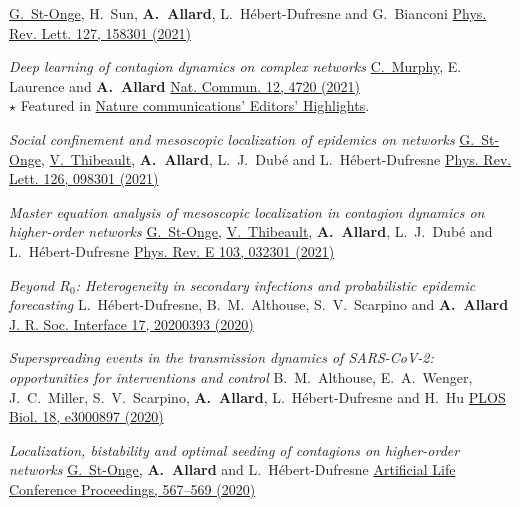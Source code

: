 \documentclass[11pt]{article}
\makeatletter
\newcommand{\reversearabic}[1]{\expandafter\@reversearabic\csname c@#1\endcsname}
\newcommand{\@reversearabic}[1]{%
  \number\numexpr\getrefnumber{this@etaremune@\romannumeral\c@etaremune}-#1+1\relax
}
\newcounter{etaremune}
\newenvironment{etaremune}[1][]{%
  \stepcounter{etaremune}%
  \begin{enumerate}[label=\reversearabic*.,#1]%
}{%
  \edef\@currentlabel{\the\csname c@\@enumctr\endcsname}%
  \label{this@etaremune@\romannumeral\c@etaremune}%
  \end{enumerate}%
}
\makeatother
\begin{document}
\begin{etaremune}[itemsep=0.5em, label={[A\reversearabic*]}]
{  \uline{G.~St-Onge}, H.~Sun, \textbf{A.~Allard}, L.~H\'ebert-Dufresne and G.~Bianconi\split
  \href{https://doi.org/10.1103/PhysRevLett.127.158301}{Phys. Rev. Lett. 127, 158301 (2021)}}
%
  \item \parbox[t]{\textwidth-30pt}{\textit{Deep learning of contagion dynamics on complex networks}\split
  \uline{C.~Murphy}, E. Laurence and \textbf{A.~Allard}\split
  \href{https://doi.org/10.1038/s41467-021-24732-2}{Nat. Commun. 12, 4720 (2021)}\\
  {\footnotesize $\star$ Featured in \href{https://www.nature.com/ncomms/editorshighlights}{Nature communications' Editors' Highlights}.}}
%
  \item \parbox[t]{\textwidth-30pt}{\textit{Social confinement and mesoscopic localization of epidemics on networks}\split
  \uline{G.~St-Onge}, \uline{V.~Thibeault}, \textbf{A.~Allard}, L.~J.~Dub\'e and L.~H\'ebert-Dufresne\split
  \href{http://doi.org/10.1103/PhysRevLett.126.098301}{Phys. Rev. Lett. 126, 098301 (2021)}}
%
  \item \parbox[t]{\textwidth-30pt}{\textit{Master equation analysis of mesoscopic localization in contagion dynamics on higher-order networks}\split
  \uline{G.~St-Onge}, \uline{V.~Thibeault}, \textbf{A.~Allard}, L.~J.~Dub\'e and L.~H\'ebert-Dufresne\split
  \href{http://doi.org/10.1103/PhysRevE.103.032301}{Phys. Rev. E 103, 032301 (2021)}}
  \item \parbox[t]{\textwidth-30pt}{\textit{Beyond $R_0$: Heterogeneity in secondary infections and probabilistic epidemic forecasting}\split
  L.~H\'ebert-Dufresne, B.~M.~Althouse, S.~V.~Scarpino and \textbf{A.~Allard}\split
  \href{https://doi.org/10.1098/rsif.2020.0393}{J. R. Soc. Interface 17, 20200393 (2020)}}
%
  \item \parbox[t]{\textwidth-30pt}{\textit{Superspreading events in the transmission dynamics of SARS-CoV-2: opportunities for interventions and control}\split
  B.~M.~Althouse, E.~A.~Wenger, J.~C.~Miller, S.~V.~Scarpino, \textbf{A.~Allard}, L.~H\'ebert-Dufresne and H.~Hu\split
  \href{https://doi.org/10.1371/journal.pbio.3000897}{PLOS Biol. 18, e3000897 (2020)}}
%
  \item \parbox[t]{\textwidth-30pt}{\textit{Localization, bistability and optimal seeding of contagions on higher-order networks}\split
  \uline{G.~St-Onge}, \textbf{A.~Allard} and L.~H\'ebert-Dufresne\split
  \href{https://doi.org/10.1162/isal_a_00327}{Artificial Life Conference Proceedings, 567--569 (2020)}}

\end{etaremune}
\end{document}

